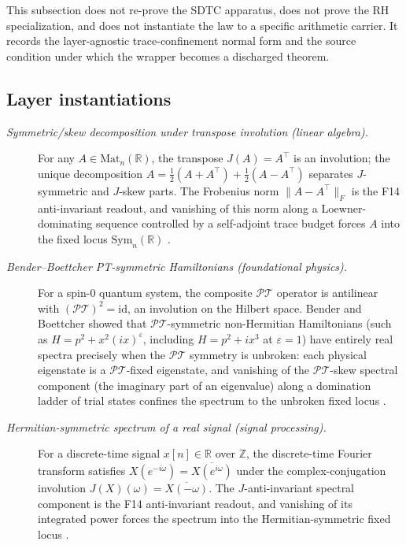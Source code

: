 \documentclass[11pt]{article}
\theoremstyle{definition}
\begin{document}
This subsection does not re-prove the SDTC apparatus, does not prove
the RH specialization, and does not instantiate the law to a specific
arithmetic carrier.  It records the layer-agnostic trace-confinement
normal form and the source condition under which the wrapper becomes
a discharged theorem.

\subsection*{Layer instantiations}\label{layer-inst:F14}

\begin{description}
\item[\emph{Symmetric/skew decomposition under transpose involution
(linear algebra).}]
For any \(A\in\mathrm{Mat}_n(\mathbb R)\), the transpose
\(J(A)=A^{\!\top}\) is an involution; the unique decomposition
\(A=\tfrac12(A+A^{\!\top})+\tfrac12(A-A^{\!\top})\) separates
\(J\)-symmetric and \(J\)-skew parts.  The Frobenius norm
\(\lVert A-A^{\!\top}\rVert_F\) is the F14 anti-invariant readout,
and vanishing of this norm along a Loewner-dominating sequence
controlled by a self-adjoint trace budget forces \(A\) into the
fixed locus \(\mathrm{Sym}_n(\mathbb R)\)
\citep{HornJohnson2013MatrixAnalysis}.

\item[\emph{Bender--Boettcher {PT}-symmetric Hamiltonians
(foundational physics).}]
For a spin-\(0\) quantum system, the composite \(\mathcal{PT}\)
operator is antilinear with \((\mathcal{PT})^2=\mathrm{id}\), an
involution on the Hilbert space.  Bender and Boettcher showed that
\(\mathcal{PT}\)-symmetric non-Hermitian Hamiltonians (such as
\(H=p^2+x^2(ix)^{\varepsilon}\), including \(H=p^2+ix^3\) at
\(\varepsilon=1\)) have entirely real spectra precisely when the
\(\mathcal{PT}\) symmetry is unbroken: each physical eigenstate is
a \(\mathcal{PT}\)-fixed eigenstate, and vanishing of the
\(\mathcal{PT}\)-skew spectral component (the imaginary part of an
eigenvalue) along a domination ladder of trial states confines the
spectrum to the unbroken fixed locus
\citep{BenderBoettcher1998PTSymmetric}.

\item[\emph{Hermitian-symmetric spectrum of a real signal (signal
processing).}]
For a discrete-time signal \(x[n]\in\mathbb R\) over \(\mathbb Z\),
the discrete-time Fourier transform satisfies
\(X(e^{-i\omega})=\overline{X(e^{i\omega})}\) under the
complex-conjugation involution
\(J(X)(\omega)=\overline{X(-\omega)}\).  The
\(J\)-anti-invariant spectral component is the F14 anti-invariant
readout, and vanishing of its integrated power forces the spectrum
into the Hermitian-symmetric fixed locus
\citep{OppenheimSchafer2010DiscreteTimeSP}.


\end{description}
\end{document}

